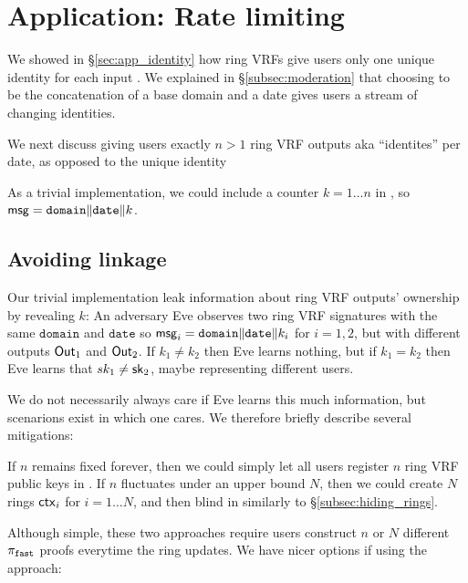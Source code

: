 \section{Application: Rate limiting}
\label{sec:app_rate_limits}

We showed in \S\ref{sec:app_identity} how ring VRFs give users only
one unique identity for each input \msg.  
We explained in \S\ref{subsec:moderation} that choosing \msg to be
the concatenation of a base domain and a date gives users a stream of changing identities.

We next discuss giving users exactly $n > 1$ ring VRF outputs aka
``identites'' per date, as opposed to the unique identity 



As a trivial implementation, we could include a counter $k = 1 \ldots n$
in \msg, so $\mathsf{msg} = \mathtt{domain} \| \mathtt{date} \| k$.


\subsection{Avoiding linkage}

Our trivial implementation leak information about ring VRF outputs'
 ownership by revealing $k$:
%
An adversary Eve observes two ring VRF signatures with the same
$\mathtt{domain}$ and $\mathtt{date}$ so
$\mathsf{msg}_i = \mathtt{domain} \| \mathtt{date} \| k_i$
for $i=1,2$, but with different outputs ${\mathsf{Out}}_1$ and ${\mathsf{Out}}_2$.
If $k_1 \ne k_2$ then Eve learns nothing, but if $k_1 = k_2$ then
 Eve learns that $sk_1 \ne \mathsf{sk}_2$, maybe representing different users. 

We do not necessarily always care if Eve learns this much information,
but scenarions exist in which one cares.  We therefore briefly describe
several mitigations:

If $n$ remains fixed forever, then we could simply let all users
register $n$ ring VRF public keys in \ctx.
If $n$ fluctuates under an upper bound $N$, then we could create $N$
rings $\mathsf{ctx}_i$ for $i = 1 \ldots N$, and
 then blind \comring in \pifast similarly to \S\ref{subsec:hiding_rings}.

Although simple, these two approaches require users construct $n$ or $N$
different $\pi_{\mathtt{fast}}$ proofs everytime the ring \ctx updates.
We have nicer options if using the \pisafe approach: 

